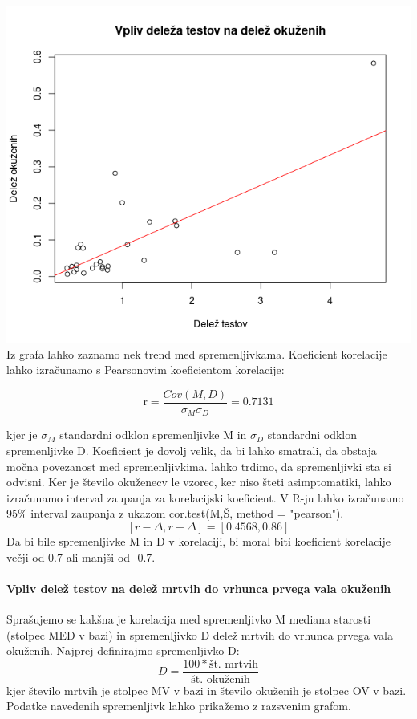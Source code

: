 \documentclass[a4paper,11pt]{article}
\begin{document}
\includegraphics[scale=0.6]{vpliv_deleza_testov_na_delez_okuzenih}
Iz grafa lahko zaznamo nek trend med spremenljivkama. Koeficient korelacije lahko izračunamo s Pearsonovim koeficientom korelacije:

\begin{center}
\[\text{r} = \frac{Cov(M,D)}{\sigma_{M} \sigma_{D}} = 0.7131\]
\end{center} 
kjer je \(\sigma_{M}\) standardni odklon spremenljivke M in \(\sigma_{D}\) standardni odklon spremenljivke D. Koeficient je dovolj velik, da bi lahko smatrali, da obstaja močna povezanost med spremenljivkima. lahko trdimo, da spremenljivki sta si odvisni.
Ker je število okuženecv le vzorec, ker niso šteti asimptomatiki, lahko izračunamo interval zaupanja za korelacijski koeficient. V R-ju lahko izračunamo 95\% interval zaupanja z ukazom cor.test(M,Š, method = "pearson").
\[[r - \Delta, r + \Delta] = [0.4568, 0.86]\]
Da bi bile spremenljivke M in D v korelaciji, bi moral biti koeficient korelacije večji od 0.7 ali manjši od -0.7.

\paragraph{Vpliv delež testov na delež mrtvih do vrhunca prvega vala okuženih}
Sprašujemo se kakšna je korelacija med spremenljivko M mediana starosti (stolpec MED v bazi) in spremenljivko D delež mrtvih do vrhunca prvega vala okuženih. Najprej definirajmo spremenljivko D:
\[D = \frac{100 * \text{št. mrtvih}}{\text{št. okuženih}}\]
kjer število mrtvih je stolpec MV v bazi in število okuženih je stolpec OV v bazi. Podatke navedenih spremenljivk lahko prikažemo z razsvenim grafom.
\end{document}
